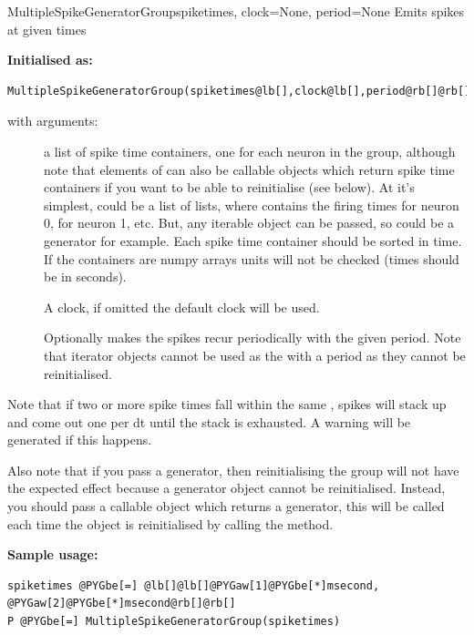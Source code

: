 \documentclass[letterpaper,10pt]{manual}
\begin{document}
\hypertarget{brian.MultipleSpikeGeneratorGroup}{}\begin{classdesc}{MultipleSpikeGeneratorGroup}{spiketimes, clock=None, period=None}
Emits spikes at given times

\textbf{Initialised as:}

\begin{Verbatim}[commandchars=@\[\]]
MultipleSpikeGeneratorGroup(spiketimes@lb[],clock@lb[],period@rb[]@rb[])
\end{Verbatim}

with arguments:
\begin{description}
\item[]
a list of spike time containers, one for each neuron in the group,
although note that elements of  can also be callable objects which
return spike time containers if you want to be able to reinitialise (see below).
At it's simplest,  could be a list of lists, where  contains
the firing times for neuron 0,  for neuron 1, etc. But, any iterable
object can be passed, so  could be a generator for example. Each
spike time container should be sorted in time. If the containers are numpy arrays units
will not be checked (times should be in seconds).

\item[]
A clock, if omitted the default clock will be used.

\item[]
Optionally makes the spikes recur periodically with the given
period. Note that iterator objects cannot be used as the 
with a period as they cannot be reinitialised.

\end{description}

Note that if two or more spike times fall within the same , spikes will stack up
and come out one per dt until the stack is exhausted. A warning will be generated
if this happens.

Also note that if you pass a generator, then reinitialising the group will not have the
expected effect because a generator object cannot be reinitialised. Instead, you should
pass a callable object which returns a generator, this will be called each time the
object is reinitialised by calling the  method.

\textbf{Sample usage:}

\begin{Verbatim}[commandchars=@\[\]]
spiketimes @PYGbe[=] @lb[]@lb[]@PYGaw[1]@PYGbe[*]msecond, @PYGaw[2]@PYGbe[*]msecond@rb[]@rb[]
P @PYGbe[=] MultipleSpikeGeneratorGroup(spiketimes)
\end{Verbatim}
\end{classdesc}
\end{document}
